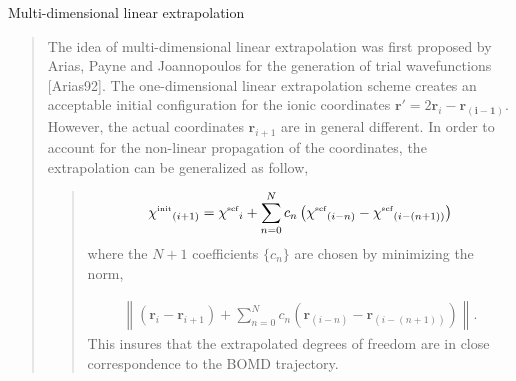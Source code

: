 \documentclass[letterpaper,10pt,english]{sphinxmanual}
\begin{document}
Multi-dimensional linear extrapolation
\begin{quote}

\begin{DUlineblock}{0em}
\item[] The idea of multi-dimensional linear extrapolation was first
proposed by Arias, Payne and Joannopoulos for the generation of
trial wavefunctions {[}Arias92{]}. The
one-dimensional linear extrapolation scheme creates an acceptable
initial configuration for the ionic coordinates
\(\mathbf{r'}=2\mathbf{r}_i-\mathbf{r_{(i-1)}}\). However, the
actual coordinates \(\mathbf{r}_{i+1}\) are in general
different. In order to account for the non-linear propagation of
the coordinates, the extrapolation can be generalized as follow,
\end{DUlineblock}
\begin{quote}
\label{\detokenize{BOMD:equation-multixtpol1}}\begin{equation}\label{equation:BOMD:multixtpol1}
\begin{split}\chi{^{\mbox{\tiny{init}}}}_{(i+1)} = \chi{^{\mbox{\tiny{scf}}}}_{i} + \sum_{n=0}^{N} c_n \left(\chi{^{\mbox{\tiny{scf}}}}_{(i-n)}  - \chi{^{\mbox{\tiny{scf}}}}_{(i-(n+1))} \right)\end{split}
\end{equation}
where the \(N+1\) coefficients \(\{c_n\}\) are chosen by
minimizing the norm,

\label{\detokenize{BOMD:equation-multixtpol2}}\begin{equation}\label{equation:BOMD:multixtpol2}
\begin{split}\left\| \left(\mathbf{r}_{i} - \mathbf{r}_{i+1} \right) + \sum_{n=0}^{N} c_n \left(\mathbf{r}_{(i-n)}  - \mathbf{r}_{(i-(n+1))} \right) \right\|.\end{split}
\end{equation}
This insures that the extrapolated degrees of freedom are in
close correspondence to the BOMD trajectory.
\end{quote}
\end{quote}
\end{document}
